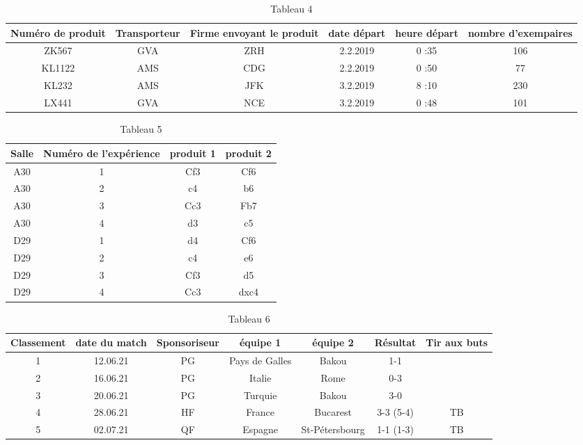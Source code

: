 \documentclass{article}
\begin{document}
\begin{table}[h!]
    \centering
    \begin{tabular}{|c|c|c|c|c|c|}
        \hline
Numéro de produit & Transporteur & Firme envoyant le produit & date départ & heure départ & nombre d'exempaires \\
        \hline
        \hline
ZK567 & GVA & ZRH & 2.2.2019 & 0 :35 & 106 \\
\hline
KL1122 & AMS & CDG & 2.2.2019 & 0 :50 & 77 \\
\hline
KL232 & AMS & JFK & 3.2.2019 & 8 :10 & 230 \\
\hline
LX441 & GVA & NCE & 3.2.2019 & 0 :48 & 101 \\
\hline
    \end{tabular}
    \caption{Tableau 4}
    \label{tab:my_label}
\end{table}

\begin{table}[h!]
    \centering
    \begin{tabular}{|c|c|c|c|}
\hline
Salle & Numéro de l'expérience & produit 1 & produit 2 \\
\hline
\hline
A30 & 1 & Cf3 & Cf6 \\
\hline
A30 & 2 & c4 & b6 \\
\hline
A30 & 3 & Cc3 & Fb7 \\
\hline
A30 & 4 & d3 & c5 \\
\hline
D29 & 1 & d4 & Cf6 \\
\hline
D29 & 2 & c4 & e6 \\
\hline
D29 & 3 & Cf3 & d5 \\
\hline
D29 & 4 & Cc3 & dxc4 \\
\hline
    \end{tabular}
    \caption{Tableau 5}
    \label{tab:my_label}
\end{table}

\begin{table}[h!]
    \centering
    \begin{tabular}{|c|c|c|c|c|c|c|}
\hline
Classement & date du match & Sponsoriseur & équipe 1 & équipe 2 & Résultat & Tir aux buts \\
\hline
\hline
1 & 12.06.21 & PG & Pays de Galles & Bakou & 1-1 & \\
\hline
2 & 16.06.21 & PG & Italie & Rome & 0-3 & \\
\hline
3 & 20.06.21 & PG & Turquie & Bakou & 3-0 & \\
\hline
4 & 28.06.21 & HF & France & Bucarest & 3-3 (5-4) & TB \\
\hline
5 & 02.07.21 & QF & Espagne & St-Pétersbourg & 1-1 (1-3) & TB \\
\hline
    \end{tabular}
    \caption{Tableau 6}
    \label{tab:my_label}
\end{table}
\end{document}

